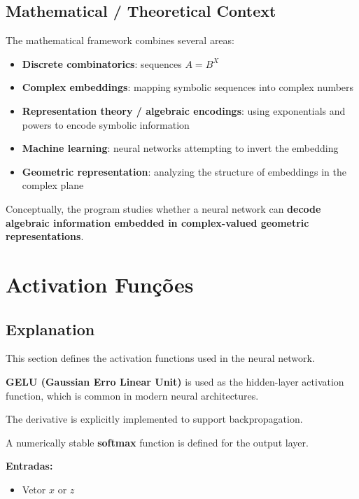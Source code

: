 \subsection{Mathematical / Theoretical Context}

The mathematical framework combines several areas:

\begin{itemize}
\item \textbf{Discrete combinatorics}: sequences \(A = B^X\)
\item \textbf{Complex embeddings}: mapping symbolic sequences into complex numbers
\item \textbf{Representation theory / algebraic encodings}: using exponentials and powers to encode symbolic information
\item \textbf{Machine learning}: neural networks attempting to invert the embedding
\item \textbf{Geometric representation}: analyzing the structure of embeddings in the complex plane
\end{itemize}

Conceptually, the program studies whether a neural network can \textbf{decode algebraic information embedded in complex-valued geometric representations}.

\newpage

\section{Activation Funções}

\subsection{Explanation}

This section defines the activation functions used in the neural network.

\textbf{GELU (Gaussian Erro Linear Unit)} is used as the hidden-layer activation function, which is common in modern neural architectures.

The derivative is explicitly implemented to support backpropagation.

A numerically stable \textbf{softmax} function is defined for the output layer.

\textbf{Entradas:}
\begin{itemize}
\item Vetor \(x\) or \(z\)
\end{itemize}

